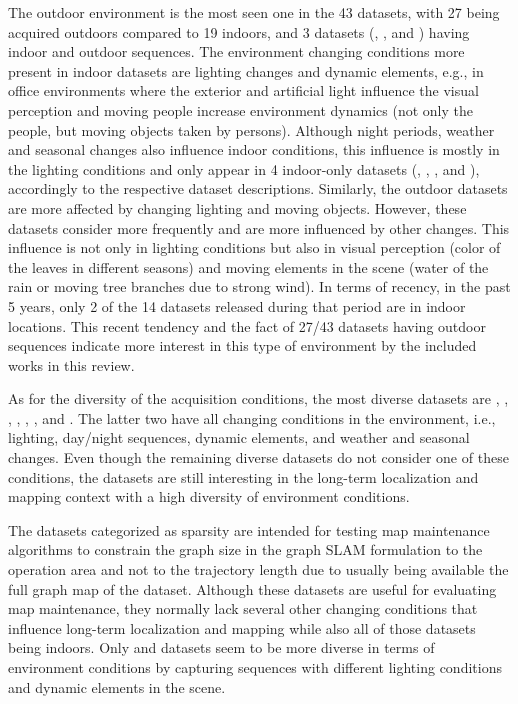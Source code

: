 The outdoor environment is the most seen one in the 43 datasets, with 27 being acquired outdoors compared to 19 indoors, and 3 datasets (, , and ) having indoor and outdoor sequences.
The environment changing conditions more present in indoor datasets are lighting changes and dynamic elements, e.g., in office environments where the exterior and artificial light influence the visual perception and moving people increase environment dynamics (not only the people, but moving objects taken by persons).
Although night periods, weather and seasonal changes also influence indoor conditions, this influence is mostly in the lighting conditions and only appear in 4 indoor-only datasets (, , , and ), accordingly to the respective dataset descriptions.
Similarly, the outdoor datasets are more affected by changing lighting and moving objects. However, these datasets consider more frequently and are more influenced by other changes. This influence is not only in lighting conditions but also in visual perception (color of the leaves in different seasons) and moving elements in the scene (water of the rain or moving tree branches due to strong wind).
In terms of recency, in the past 5 years, only 2 of the 14 datasets released during that period are in indoor locations. This recent tendency and the fact of 27/43 datasets having outdoor sequences indicate more interest in this type of environment by the included works in this review.

As for the diversity of the acquisition conditions, the most diverse datasets are , , , , , , and . The latter two have all changing conditions in the environment, i.e., lighting, day/night sequences, dynamic elements, and weather and seasonal changes. Even though the remaining diverse datasets do not consider one of these conditions, the datasets are still interesting in the long-term localization and mapping context with a high diversity of environment conditions.

The datasets categorized as sparsity are intended for testing map maintenance algorithms to constrain the graph size in the graph SLAM formulation to the operation area and not to the trajectory length due to usually being available the full graph map of the dataset. Although these datasets are useful for evaluating map maintenance, they normally lack several other changing conditions that influence long-term localization and mapping while also all of those datasets being indoors. Only  and  datasets seem to be more diverse in terms of environment conditions by capturing sequences with different lighting conditions and dynamic elements in the scene.


